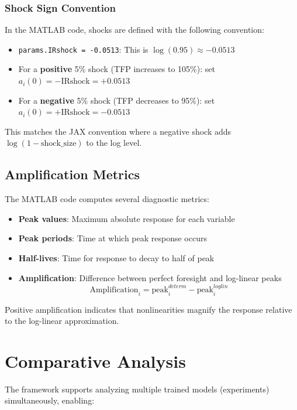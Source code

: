 \documentclass[11pt]{article}
\begin{document}
\subsubsection{Shock Sign Convention}

In the MATLAB code, shocks are defined with the following convention:
\begin{itemize}
    \item \texttt{params.IRshock = -0.0513}: This is $\log(0.95) \approx -0.0513$
    \item For a \textbf{positive} 5\% shock (TFP increases to 105\%): set $a_i(0) = -\text{IRshock} = +0.0513$
    \item For a \textbf{negative} 5\% shock (TFP decreases to 95\%): set $a_i(0) = +\text{IRshock} = -0.0513$
\end{itemize}

This matches the JAX convention where a negative shock adds $\log(1 - \text{shock\_size})$ to the log level.

\subsection{Amplification Metrics}

The MATLAB code computes several diagnostic metrics:
\begin{itemize}
    \item \textbf{Peak values}: Maximum absolute response for each variable
    \item \textbf{Peak periods}: Time at which peak response occurs
    \item \textbf{Half-lives}: Time for response to decay to half of peak
    \item \textbf{Amplification}: Difference between perfect foresight and log-linear peaks
    \begin{equation}
        \text{Amplification}_i = \text{peak}^{determ}_i - \text{peak}^{loglin}_i
    \end{equation}
\end{itemize}

Positive amplification indicates that nonlinearities magnify the response relative to the log-linear approximation.

\section{Comparative Analysis}

The framework supports analyzing multiple trained models (experiments) simultaneously, enabling:
\end{document}
